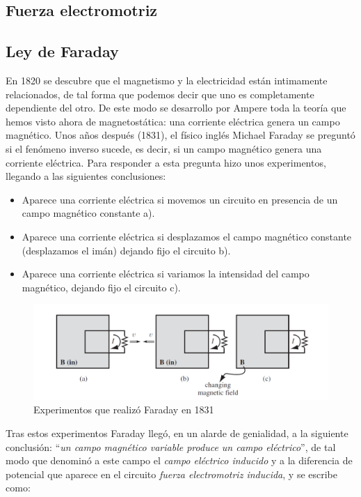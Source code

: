 \documentclass[12pt,a4paper]{article}
\begin{document}
\subsection{Fuerza electromotriz}

\subsection{Ley de Faraday}

En 1820 se descubre que el magnetismo y la electricidad están intimamente relacionados, de tal forma que podemos decir que uno es completamente dependiente del otro. De este modo se desarrollo por Ampere toda la teoría que hemos visto ahora de magnetostática: una corriente eléctrica genera un campo magnético. Unos años después (1831), el físico inglés Michael Faraday se preguntó si el fenómeno inverso sucede, es decir, si un campo magnético genera una corriente eléctrica. Para responder a esta pregunta hizo unos experimentos, llegando a las siguientes conclusiones:

\begin{itemize}
\item Aparece una corriente eléctrica si movemos un circuito en presencia de un campo magnético constante a).

\item Aparece una corriente eléctrica si desplazamos el campo magnético constante (desplazamos el imán) dejando fijo el circuito b).

\item Aparece una corriente eléctrica si variamos la intensidad del campo magnético, dejando fijo el circuito c).
\end{itemize}

\begin{figure}[h!] \centering
\includegraphics[scale=0.7]{figura-griffiths-7.21.png}
\caption{Experimentos que realizó Faraday en 1831}
\end{figure}

Tras estos experimentos Faraday llegó, en un alarde de genialidad, a la siguiente conclusión: ``\textit{un campo magnético variable produce un campo eléctrico}'', de tal modo que denominó a este campo el \textit{campo eléctrico inducido} y a la diferencia de potencial que aparece en el circuito \textit{fuerza electromotriz inducida}, y se escribe como:
\end{document}
